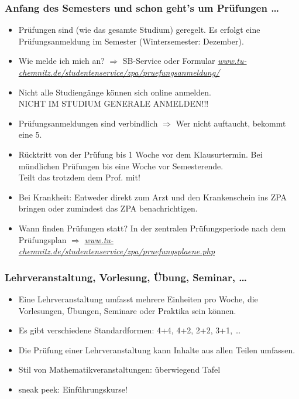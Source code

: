\documentclass[10pt]{beamer}
\makeatletter
\newcommand{\highl}[1]{\color{tuccolor@ma}#1\color{black}}
\makeatother
\begin{document}
\begin{frame}
\frametitle{Anfang des Semesters und schon geht's um Prüfungen \dots}
\begin{itemize}
	\item Prüfungen sind (wie das gesamte Studium) geregelt. Es erfolgt eine Prüfungsanmeldung im Semester (Wintersemester: Dezember).
	\item Wie melde ich mich an? $\Rightarrow$ SB-Service oder Formular \textit{\href{https://www.tu-chemnitz.de/studentenservice/zpa/pruefungsanmeldung/index.php}{www.tu-chemnitz.de/studentenservice/zpa/pruefungsanmeldung/}}
	\item Nicht alle Studiengänge können sich online anmelden.\\
	 \highl{NICHT IM STUDIUM GENERALE ANMELDEN!!!}
	\item Prüfungsanmeldungen sind verbindlich $\Rightarrow$ Wer nicht auftaucht, bekommt eine 5. 
	\item Rücktritt von der Prüfung bis 1 Woche vor dem Klausurtermin. Bei mündlichen Prüfungen bis eine Woche vor Semesterende.\\
	\highl{Teilt das trotzdem dem Prof. mit!}
	\item Bei Krankheit: Entweder direkt zum Arzt und den Krankenschein ins ZPA bringen oder zumindest das ZPA benachrichtigen.
	\item Wann finden Prüfungen statt? In der zentralen Prüfungsperiode nach dem Prüfungsplan $\Rightarrow$ \textit{\href{https://www.tu-chemnitz.de/studentenservice/zpa/pruefungsplaene.php}{www.tu-chemnitz.de/studentenservice/zpa/pruefungsplaene.php}}
\end{itemize}
\end{frame}

\begin{frame}
\frametitle{Lehrveranstaltung, Vorlesung, Übung, Seminar, \ldots}
\begin{itemize}
	\item Eine Lehrveranstaltung umfasst mehrere Einheiten pro Woche, die Vorlesungen, Übungen, Seminare oder Praktika sein können. 
	\item Es gibt verschiedene Standardformen: 4+4, 4+2, 2+2, 3+1, \ldots
	\item Die Prüfung einer Lehrveranstaltung kann Inhalte aus allen Teilen umfassen.
	\item Stil von Mathematikveranstaltungen: überwiegend Tafel
	\item sneak peek: Einführungskurse!
\end{itemize}
\end{frame}
\end{document}
